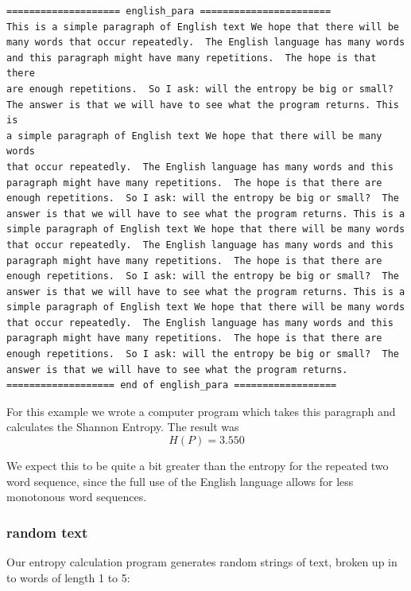 \documentclass[11pt]{article}
\begin{document}
\begin{tiny}
\begin{verbatim}
==================== english_para =======================
This is a simple paragraph of English text We hope that there will be
many words that occur repeatedly.  The English language has many words
and this paragraph might have many repetitions.  The hope is that there
are enough repetitions.  So I ask: will the entropy be big or small?
The answer is that we will have to see what the program returns. This is
a simple paragraph of English text We hope that there will be many words
that occur repeatedly.  The English language has many words and this
paragraph might have many repetitions.  The hope is that there are
enough repetitions.  So I ask: will the entropy be big or small?  The
answer is that we will have to see what the program returns. This is a
simple paragraph of English text We hope that there will be many words
that occur repeatedly.  The English language has many words and this
paragraph might have many repetitions.  The hope is that there are
enough repetitions.  So I ask: will the entropy be big or small?  The
answer is that we will have to see what the program returns. This is a
simple paragraph of English text We hope that there will be many words
that occur repeatedly.  The English language has many words and this
paragraph might have many repetitions.  The hope is that there are
enough repetitions.  So I ask: will the entropy be big or small?  The
answer is that we will have to see what the program returns.
=================== end of english_para ==================
\end{verbatim}
\end{tiny}

For this example we wrote a computer program which takes this
paragraph and calculates the Shannon Entropy.  The result was
$$
H(P) = 3.550
$$

We expect this to be quite a bit greater than the entropy for the
repeated two word sequence, since the full use of the English language
allows for less monotonous word sequences.

\subsubsection{random text}

Our entropy calculation program generates random strings of text,
broken up in to words of length 1 to 5:
\end{document}
